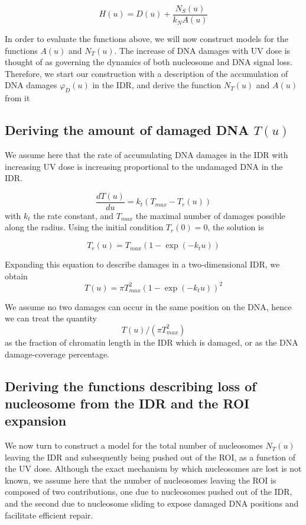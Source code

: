 \documentclass[12pt]{article}
\begin{document}
	\begin{equation}\label{eq:nucleosomeStst}
	H(u) = D(u) + \frac{N_S(u)}{k_NA(u)}	
	\end{equation}
	
	In order to evaluate the functions above, we will now construct models
	for the functions $A(u)$ and $N_T(u)$. The increase of DNA damages with UV
	dose is thought of as governing the dynamics of both nucleosome and DNA
	signal loss. Therefore, we start our construction with a description of the
	accumulation of DNA damages $\varphi_D(u)$ in the IDR, and derive the function $N_T(u)$ and $A(u)$ from it
	
	\subsection{Deriving the amount of damaged DNA $T(u)$}
	We assume here that the rate of accumulating DNA damages in the
	IDR with increasing UV dose is increasing proportional
	to the undamaged DNA in the IDR.
	
	\begin{equation*}
	\frac{dT(u)}{du} = k_t(T_{max} - T_r(u))
	\end{equation*}	
	with $k_t$ the rate constant, and $T_{max}$ the maximal number of damages possible
	along the radius. Using the initial condition $T_r(0) = 0$, the solution is
	
	\begin{equation*}
	T_r(u) = T_{max}(1-\exp(−k_tu))
	\end{equation*}
	
	Expanding this equation to describe damages in a two-dimensional IDR, we
	obtain
	\begin{equation}\label{eq:damagesIDR}
	T(u) = \pi T_{max}^2 (1-\exp(−k_tu))^2
	\end{equation}
	
	We assume no two damages can occur in the same position on the DNA,
	hence we can treat the quantity
	\begin{equation*}
	T(u)/(\pi T_{max}^2)
	\end{equation*}
	as the fraction of chromatin length in the IDR which is damaged, or as the
	DNA damage-coverage percentage.
	
	\subsection{Deriving the functions describing loss of nucleosome from the IDR and the ROI expansion}
	We now turn to construct a model for the total number of nucleosomes $N_T(u)$
	leaving the IDR and subsequently being pushed out of the ROI, as a function
	of the UV dose. Although the exact mechanism by which nucleosomes are
	lost is not known, we assume here that the number of nucleosomes leaving
	the ROI is composed of two contributions, one due to nucleosomes pushed
	out of the IDR, and the second due to nucleosome sliding to expose damaged
	DNA positions and facilitate efficient repair.
	
\end{document}

